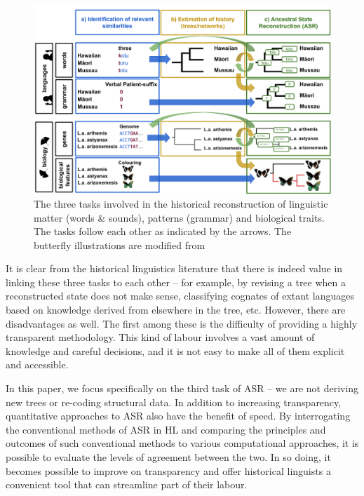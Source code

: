 \documentclass[12pt,letterpaper]{article}
\begin{document}
\begin{figure}
\centering
\includegraphics[width=22cm]{illustrations/ASR_HL_explainer_ill.png}
\caption{The three tasks involved in the historical reconstruction of linguistic matter (words \& sounds), patterns (grammar) and biological traits. The tasks follow each other as indicated by the arrows. The butterfly illustrations are modified from \citet{savage2009single}}
\label{fig:HL_tasks}
\end{figure}

It is clear from the historical linguistics literature that there is indeed value in linking these three tasks to each other -- for example, by revising a tree when a reconstructed state does not make sense, classifying cognates of extant languages based on knowledge derived from elsewhere in the tree, etc. However, there are disadvantages as well. The first among these is the difficulty of providing a highly transparent methodology. This kind of labour involves a vast amount of knowledge and careful decisions, and it is not easy to make all of them explicit and accessible. 

In this paper, we focus specifically on the third task of ASR -- we are not deriving new trees or re-coding structural data. In addition to increasing transparency, quantitative approaches to ASR also have the benefit of speed. By interrogating the conventional methods of ASR in HL and comparing the principles and outcomes of such conventional methods to various computational approaches, it is possible to evaluate the levels of agreement between the two. In so doing, it becomes possible to improve on transparency and offer historical linguists a convenient tool that can streamline part of their labour.
\end{document}
